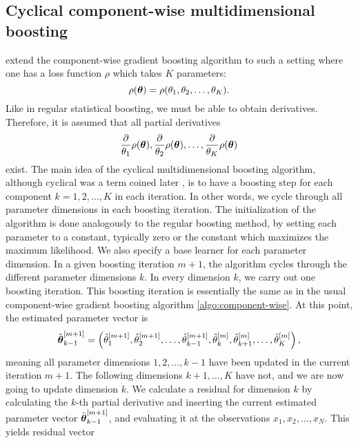 \subsection{Cyclical component-wise multidimensional boosting}
\citet{schmid} extend the component-wise gradient boosting algorithm \citep{friedman2001} to such a setting where one has a loss function  $\rho$ which takes $K$ parameters:
\begin{equation}
    \rho(\boldsymbol{\theta})=\rho(\theta_1,\theta_2,\ldots,\theta_K).
\end{equation}
Like in regular statistical boosting, we must be able to obtain derivatives. Therefore, it is assumed that all partial derivatives
\begin{equation}
    \frac{\partial}{\theta_1}\rho(\boldsymbol{\theta}),\frac{\partial}{\theta_2}\rho(\boldsymbol{\theta}),\ldots,\frac{\partial}{\theta_K}\rho(\boldsymbol{\theta})
\end{equation}
exist. The main idea of the cyclical multidimensional boosting algorithm, although cyclical was a term coined later \citep{thomas2018}, is to have a boosting step for each component $k=1,2,\ldots,K$ in each iteration. In other words, we cycle through all parameter dimensions in each boosting iteration. The initialization of the algorithm is done analogously to the regular boosting method, by setting each parameter to a constant, typically zero or the constant which maximizes the maximum likelihood. We also specify a base learner for each parameter dimension. In a given boosting iteration $m+1$, the algorithm cycles through the different parameter dimensions $k$. In every dimension $k$, we carry out one boosting iteration. This boosting iteration is essentially the same as in the usual component-wise gradient boosting algorithm \eqref{algo:component-wise}. At this point, the estimated parameter vector is
\begin{equation*}
    \hat{\boldsymbol{\theta}}_{k-1}^{[m+1]}=\left(\hat{\theta}_1^{[m+1]},\hat{\theta}_2^{[m+1]},\ldots,\hat{\theta}_{k-1}^{[m+1]},\hat{\theta}_{k}^{[m]},\hat{\theta}_{k+1}^{[m]},\ldots,\hat{\theta}_{K}^{[m]}\right),
\end{equation*}
meaning all parameter dimensions $1,2,\ldots,k-1$ have been updated in the current iteration $m+1$. The following dimensions $k+1,\ldots,K$ have not, and we are now going to update dimension $k$. We calculate a residual for dimension $k$ by calculating the $k$-th partial derivative and inserting the current estimated parameter vector $\hat{\boldsymbol{\theta}}_{k-1}^{[m+1]}$, and evaluating it at the observations $x_1,x_2,\ldots,x_N$. This yields residual vector

